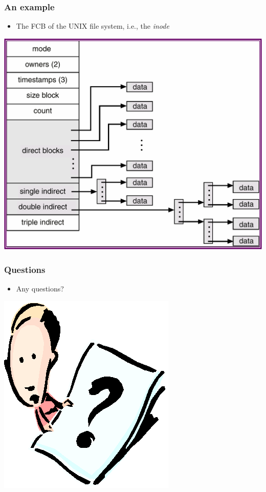 \documentclass[CJKutf8,xcolor=pdftex,dvipsnames,table]{beamer}
\begin{document}
\begin{CJK*}{UTF8}{song}
  \begin{frame}
    \frametitle{An example} \pause
    \begin{itemize}\parskip=0pt
    \item The FCB of the UNIX file system, i.e., the \emph{inode} \pause
    \end{itemize}
    \begin{center}
      \includegraphics[scale=.5]{v6f12-9}
    \end{center}
  \end{frame}
  
  \begin{frame}
    \frametitle{Questions}
    \begin{itemize}
    \item Any questions?
    \end{itemize}
    \begin{center}
      \includegraphics[scale=.5]{question}
    \end{center}
  \end{frame}
  

\end{CJK*}
\end{document}
